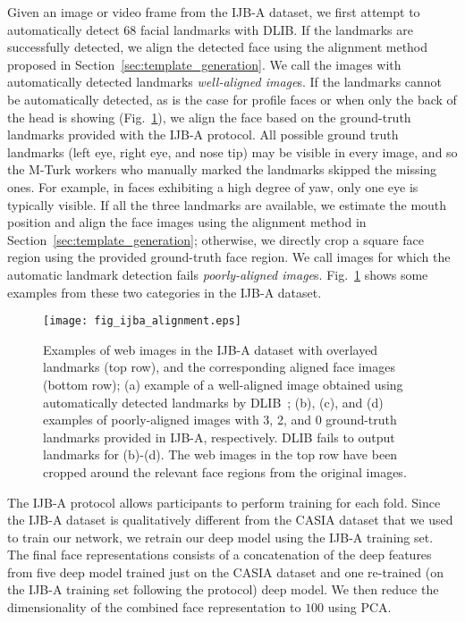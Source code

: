 \documentclass[10pt,journal,compsoc]{IEEEtran}
\begin{document}
Given an image or video frame from the IJB-A dataset, we first attempt to automatically detect $68$ facial landmarks with DLIB. If the landmarks are successfully detected, we align the detected face using the alignment method proposed in Section~\ref{sec:template_generation}. We call the images with automatically detected landmarks \emph{well-aligned image}s. If the landmarks cannot be automatically detected, as is the case for profile faces or when only the back of the head is showing (Fig.~\ref{fig:ijba-alignment}), we align the face based on the ground-truth landmarks provided with the IJB-A protocol. All possible ground truth landmarks (left eye, right eye, and nose tip) may be visible in every image, and so the M-Turk workers who manually marked the landmarks skipped the missing ones. For example, in faces exhibiting a high degree of yaw, only one eye is typically visible. If all the three landmarks are available, we estimate the mouth position and align the face images using the alignment method in Section~\ref{sec:template_generation}; otherwise, we directly crop a square face region using the provided ground-truth face region. We call images for which the automatic landmark detection fails \emph{poorly-aligned image}s. Fig.~\ref{fig:ijba-alignment} shows some examples from these two categories in the IJB-A dataset.

\newcommand{\mtablew}{0.70in}
\newcommand{\mimgw}{0.65in}
\begin{figure}
\centering
  \texttt{[image: fig\_ijba\_alignment.eps]}
  \caption{Examples of web images in the IJB-A dataset with overlayed landmarks (top row), and the corresponding aligned face images (bottom row); (a) example of a well-aligned image obtained using automatically detected landmarks by DLIB~\cite{kazemi2014one}; (b), (c), and (d) examples of poorly-aligned images with 3, 2, and 0 ground-truth landmarks provided in IJB-A, respectively. DLIB fails to output landmarks for (b)-(d). The web images in the top row have been cropped around the relevant face regions from the original images.} \label{fig:ijba-alignment}
\end{figure}

The IJB-A protocol allows participants to perform training for each fold. Since the IJB-A dataset is qualitatively different from the CASIA dataset that we used to train our network, we retrain our deep model using the IJB-A training set. The final face representations consists of a concatenation of the deep features from five deep model trained just on the CASIA dataset and one re-trained (on the IJB-A training set following the protocol) deep model. We then reduce the dimensionality of the combined face representation to $100$ using PCA.
\end{document}
